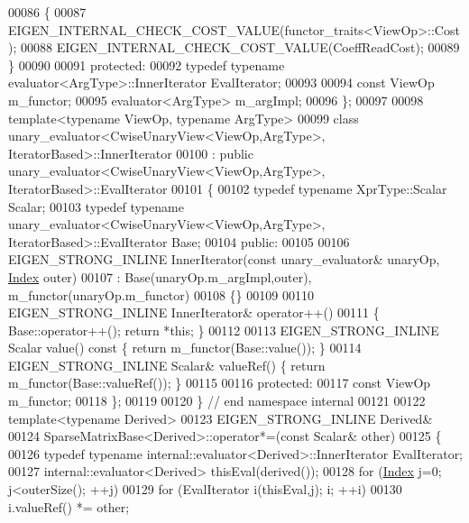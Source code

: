 \begin{DoxyCode}
00086     \{
00087       EIGEN\_INTERNAL\_CHECK\_COST\_VALUE(functor\_traits<ViewOp>::Cost);
00088       EIGEN\_INTERNAL\_CHECK\_COST\_VALUE(CoeffReadCost);
00089     \}
00090 
00091   \textcolor{keyword}{protected}:
00092     \textcolor{keyword}{typedef} \textcolor{keyword}{typename} evaluator<ArgType>::InnerIterator        EvalIterator;
00093     
00094     \textcolor{keyword}{const} ViewOp m\_functor;
00095     evaluator<ArgType> m\_argImpl;
00096 \};
00097 
00098 \textcolor{keyword}{template}<\textcolor{keyword}{typename} ViewOp, \textcolor{keyword}{typename} ArgType>
00099 \textcolor{keyword}{class }unary\_evaluator<CwiseUnaryView<ViewOp,ArgType>, IteratorBased>::InnerIterator
00100     : \textcolor{keyword}{public} unary\_evaluator<CwiseUnaryView<ViewOp,ArgType>, IteratorBased>::EvalIterator
00101 \{
00102     \textcolor{keyword}{typedef} \textcolor{keyword}{typename} XprType::Scalar Scalar;
00103     \textcolor{keyword}{typedef} \textcolor{keyword}{typename} unary\_evaluator<CwiseUnaryView<ViewOp,ArgType>, IteratorBased>::EvalIterator Base;
00104   \textcolor{keyword}{public}:
00105 
00106     EIGEN\_STRONG\_INLINE InnerIterator(\textcolor{keyword}{const} unary\_evaluator& unaryOp, \hyperlink{namespace_eigen_a62e77e0933482dafde8fe197d9a2cfde}{Index} outer)
00107       : Base(unaryOp.m\_argImpl,outer), m\_functor(unaryOp.m\_functor)
00108     \{\}
00109 
00110     EIGEN\_STRONG\_INLINE InnerIterator& operator++()
00111     \{ Base::operator++(); \textcolor{keywordflow}{return} *\textcolor{keyword}{this}; \}
00112 
00113     EIGEN\_STRONG\_INLINE Scalar value()\textcolor{keyword}{ const }\{ \textcolor{keywordflow}{return} m\_functor(Base::value()); \}
00114     EIGEN\_STRONG\_INLINE Scalar& valueRef() \{ \textcolor{keywordflow}{return} m\_functor(Base::valueRef()); \}
00115 
00116   \textcolor{keyword}{protected}:
00117     \textcolor{keyword}{const} ViewOp m\_functor;
00118 \};
00119 
00120 \} \textcolor{comment}{// end namespace internal}
00121 
00122 \textcolor{keyword}{template}<\textcolor{keyword}{typename} Derived>
00123 EIGEN\_STRONG\_INLINE Derived&
00124 SparseMatrixBase<Derived>::operator*=(\textcolor{keyword}{const} Scalar& other)
00125 \{
00126   \textcolor{keyword}{typedef} \textcolor{keyword}{typename} internal::evaluator<Derived>::InnerIterator EvalIterator;
00127   internal::evaluator<Derived> thisEval(derived());
00128   \textcolor{keywordflow}{for} (\hyperlink{namespace_eigen_a62e77e0933482dafde8fe197d9a2cfde}{Index} j=0; j<outerSize(); ++j)
00129     \textcolor{keywordflow}{for} (EvalIterator i(thisEval,j); i; ++i)
00130       i.valueRef() *= other;

\end{DoxyCode}
